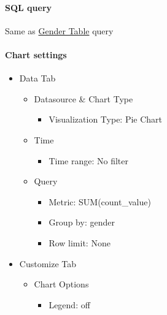 \documentclass[
]{book}
\providecommand{\tightlist}{%
  \setlength{\itemsep}{0pt}\setlength{\parskip}{0pt}}
\begin{document}
\hypertarget{sql-query-29}{%
\paragraph*{SQL query}\label{sql-query-29}}

Same as \protect\hyperlink{genderTableQuery}{Gender Table} query

\hypertarget{chart-settings-32}{%
\paragraph*{Chart settings}\label{chart-settings-32}}

\begin{itemize}
\tightlist
\item
  Data Tab

  \begin{itemize}
  \tightlist
  \item
    Datasource \& Chart Type

    \begin{itemize}
    \tightlist
    \item
      Visualization Type: Pie Chart
    \end{itemize}
  \item
    Time

    \begin{itemize}
    \tightlist
    \item
      Time range: No filter
    \end{itemize}
  \item
    Query

    \begin{itemize}
    \tightlist
    \item
      Metric: SUM(count\_value)
    \item
      Group by: gender
    \item
      Row limit: None
    \end{itemize}
  \end{itemize}
\item
  Customize Tab

  \begin{itemize}
  \tightlist
  \item
    Chart Options

    \begin{itemize}
    \tightlist
    \item
      Legend: off
    \end{itemize}
  \end{itemize}
\end{itemize}
\end{document}
